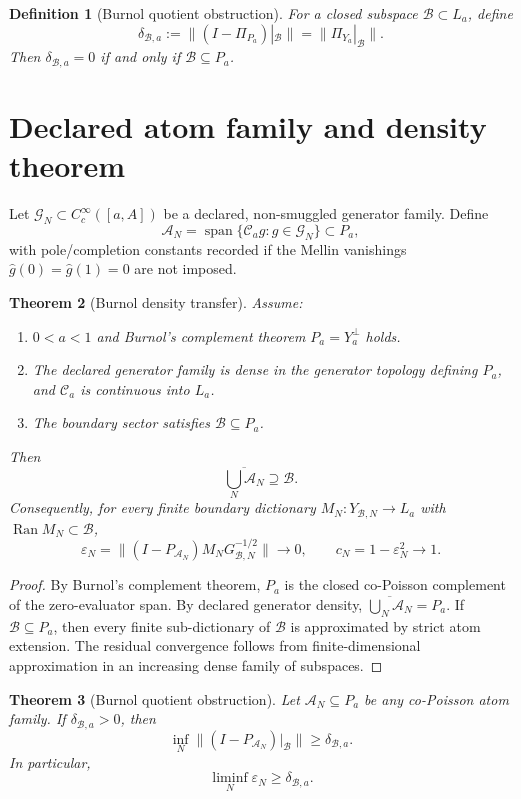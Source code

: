 \documentclass[11pt]{article}
\newtheorem{theorem}{Theorem}[section]
\newtheorem{definition}[theorem]{Definition}
\newcommand{\B}{\mathcal B}
\newcommand{\A}{\mathcal A}
\newcommand{\C}{\mathcal C}
\newcommand{\eps}{\varepsilon}
\newcommand{\spanop}{\operatorname{span}}
\newcommand{\Ran}{\operatorname{Ran}}
\begin{document}
\begin{definition}[Burnol quotient obstruction]
For a closed subspace \(\B\subset L_a\), define
\[
  \delta_{\B,a}:=\|(I-\Pi_{P_a})|_{\B}\|=\|\Pi_{Y_a}|_{\B}\|.
\]
Then \(\delta_{\B,a}=0\) if and only if \(\B\subseteq P_a\).
\end{definition}

\section{Declared atom family and density theorem}
Let \(\mathcal G_N\subset C_c^\infty([a,A])\) be a declared, non-smuggled generator family.  Define
\[
  \A_N=\spanop\{\C_ag:g\in\mathcal G_N\}\subset P_a,
\]
with pole/completion constants recorded if the Mellin vanishings \(\widehat g(0)=\widehat g(1)=0\) are not imposed.

\begin{theorem}[Burnol density transfer]
Assume:
\begin{enumerate}[label=(D\arabic*)]
\item \(0<a<1\) and Burnol's complement theorem \(P_a=Y_a^\perp\) holds.
\item The declared generator family is dense in the generator topology defining \(P_a\), and \(\C_a\) is continuous into \(L_a\).
\item The boundary sector satisfies \(\B\subseteq P_a\).
\end{enumerate}
Then
\[
  \overline{\bigcup_N\A_N}\supseteq \B.
\]
Consequently, for every finite boundary dictionary \(M_N:Y_{\B,N}\to L_a\) with \(\Ran M_N\subset\B\),
\[
  \eps_N=\|(I-P_{\A_N})M_NG_{\B,N}^{-1/2}\|\to0,
  \qquad
  c_N=1-\eps_N^2\to1.
\]
\end{theorem}

\begin{proof}
By Burnol's complement theorem, \(P_a\) is the closed co-Poisson complement of the zero-evaluator span.  By declared generator density, \(\overline{\bigcup_N\A_N}=P_a\).  If \(\B\subseteq P_a\), then every finite sub-dictionary of \(\B\) is approximated by strict atom extension.  The residual convergence follows from finite-dimensional approximation in an increasing dense family of subspaces.
\end{proof}

\begin{theorem}[Burnol quotient obstruction]
Let \(\A_N\subseteq P_a\) be any co-Poisson atom family. If \(\delta_{\B,a}>0\), then
\[
  \inf_N\|(I-P_{\A_N})|_{\B}\|\ge\delta_{\B,a}.
\]
In particular,
\[
  \liminf_N\eps_N\ge\delta_{\B,a}.
\]
\end{theorem}
\end{document}
